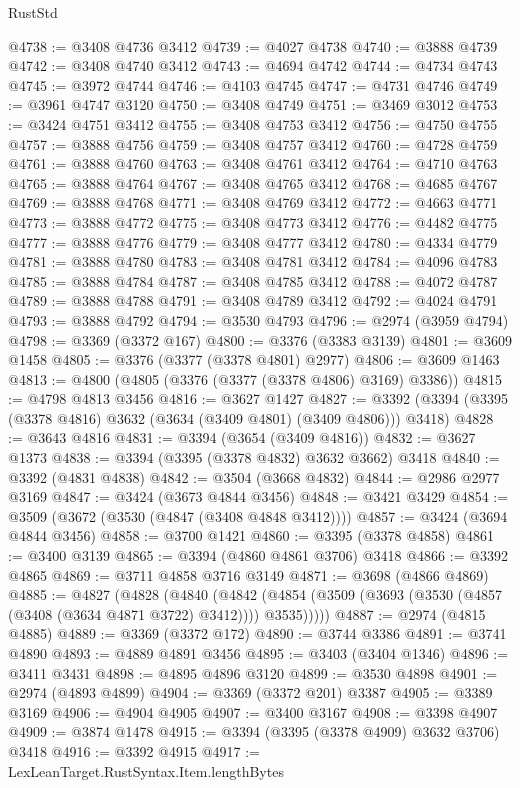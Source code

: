 \begin{lexlean}{RustStd}
\begin{coremodule}
@4738 := @3408 @4736 @3412
@4739 := @4027 @4738
@4740 := @3888 @4739
@4742 := @3408 @4740 @3412
@4743 := @4694 @4742
@4744 := @4734 @4743
@4745 := @3972 @4744
@4746 := @4103 @4745
@4747 := @4731 @4746
@4749 := @3961 @4747 @3120
@4750 := @3408 @4749
@4751 := @3469 @3012
@4753 := @3424 @4751 @3412
@4755 := @3408 @4753 @3412
@4756 := @4750 @4755
@4757 := @3888 @4756
@4759 := @3408 @4757 @3412
@4760 := @4728 @4759
@4761 := @3888 @4760
@4763 := @3408 @4761 @3412
@4764 := @4710 @4763
@4765 := @3888 @4764
@4767 := @3408 @4765 @3412
@4768 := @4685 @4767
@4769 := @3888 @4768
@4771 := @3408 @4769 @3412
@4772 := @4663 @4771
@4773 := @3888 @4772
@4775 := @3408 @4773 @3412
@4776 := @4482 @4775
@4777 := @3888 @4776
@4779 := @3408 @4777 @3412
@4780 := @4334 @4779
@4781 := @3888 @4780
@4783 := @3408 @4781 @3412
@4784 := @4096 @4783
@4785 := @3888 @4784
@4787 := @3408 @4785 @3412
@4788 := @4072 @4787
@4789 := @3888 @4788
@4791 := @3408 @4789 @3412
@4792 := @4024 @4791
@4793 := @3888 @4792
@4794 := @3530 @4793
@4796 := @2974 (@3959 @4794)
@4798 := @3369 (@3372 @167)
@4800 := @3376 (@3383 @3139)
@4801 := @3609 @1458
@4805 := @3376 (@3377 (@3378 @4801) @2977)
@4806 := @3609 @1463
@4813 := @4800 (@4805 (@3376 (@3377 (@3378 @4806) @3169) @3386))
@4815 := @4798 @4813 @3456
@4816 := @3627 @1427
@4827 := @3392 (@3394 (@3395 (@3378 @4816) @3632 (@3634 (@3409 @4801) (@3409 @4806))) @3418)
@4828 := @3643 @4816
@4831 := @3394 (@3654 (@3409 @4816))
@4832 := @3627 @1373
@4838 := @3394 (@3395 (@3378 @4832) @3632 @3662) @3418
@4840 := @3392 (@4831 @4838)
@4842 := @3504 (@3668 @4832)
@4844 := @2986 @2977 @3169
@4847 := @3424 (@3673 @4844 @3456)
@4848 := @3421 @3429
@4854 := @3509 (@3672 (@3530 (@4847 (@3408 @4848 @3412))))
@4857 := @3424 (@3694 @4844 @3456)
@4858 := @3700 @1421
@4860 := @3395 (@3378 @4858)
@4861 := @3400 @3139
@4865 := @3394 (@4860 @4861 @3706) @3418
@4866 := @3392 @4865
@4869 := @3711 @4858 @3716 @3149
@4871 := @3698 (@4866 @4869)
@4885 := @4827
    (@4828
      (@4840
        (@4842 (@4854 (@3509 (@3693 (@3530 (@4857 (@3408 (@3634 @4871 @3722) @3412)))) @3535)))))
@4887 := @2974 (@4815 @4885)
@4889 := @3369 (@3372 @172)
@4890 := @3744 @3386
@4891 := @3741 @4890
@4893 := @4889 @4891 @3456
@4895 := @3403 (@3404 @1346)
@4896 := @3411 @3431
@4898 := @4895 @4896 @3120
@4899 := @3530 @4898
@4901 := @2974 (@4893 @4899)
@4904 := @3369 (@3372 @201) @3387
@4905 := @3389 @3169
@4906 := @4904 @4905
@4907 := @3400 @3167
@4908 := @3398 @4907
@4909 := @3874 @1478
@4915 := @3394 (@3395 (@3378 @4909) @3632 @3706) @3418
@4916 := @3392 @4915
@4917 := LexLeanTarget.RustSyntax.Item.lengthBytes

\end{coremodule}
\end{lexlean}
